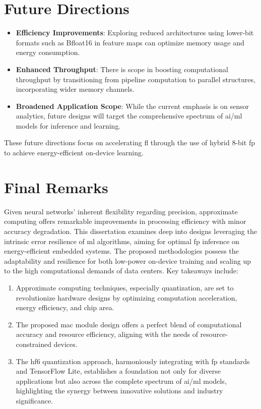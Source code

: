 \section{Future Directions}
\begin{itemize}
	\item \textbf{Efficiency Improvements}: Exploring reduced architectures using lower-bit formats such as Bfloat16 in feature maps can optimize memory usage and energy consumption.
	
	\item \textbf{Enhanced Throughput}: There is scope in boosting computational throughput by transitioning from pipeline computation to parallel structures, incorporating wider memory channels.
	
	\item \textbf{Broadened Application Scope}: While the current emphasis is on sensor analytics, future designs will target the comprehensive spectrum of \gls{ai}/\gls{ml} models for inference and learning.
\end{itemize}

These future directions focus on accelerating \gls{fl} through the use of hybrid 8-bit \gls{fp} to achieve energy-efficient on-device learning.


\section{Final Remarks}
Given neural networks' inherent flexibility regarding precision, approximate computing offers remarkable improvements in processing efficiency with minor accuracy degradation. This dissertation examines deep into designs leveraging the intrinsic error resilience of \gls{ml} algorithms, aiming for optimal \gls{fp} inference on energy-efficient embedded systems. The proposed methodologies possess the adaptability and resilience for both low-power on-device training and scaling up to the high computational demands of data centers. Key takeaways include:

\begin{enumerate}
	\item Approximate computing techniques, especially quantization, are set to revolutionize hardware designs by optimizing computation acceleration, energy efficiency, and chip area.
	
	\item The proposed \gls{mac} module design offers a perfect blend of computational accuracy and resource efficiency, aligning with the needs of resource-constrained devices.
	
	
	\item The \gls{hf6} quantization approach, harmoniously integrating with \gls{fp} standards and TensorFlow Lite, establishes a foundation not only for diverse applications but also across the complete spectrum of \gls{ai}/\gls{ml} models, highlighting the synergy between innovative solutions and industry significance.
\end{enumerate}

